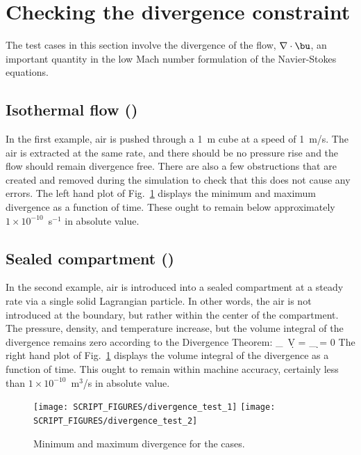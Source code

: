 \documentclass[11pt]{book}
\begin{document}
\section{Checking the divergence constraint}
\label{divergence_test}

The test cases in this section involve the divergence of the flow, $\nabla \cdot \bu$, an important quantity in the low Mach number formulation of the Navier-Stokes equations.

\subsection{Isothermal flow (\texorpdfstring{}{divergence\_test\_1})}
\label{divergence_test_1}

In the first example, air is pushed through a 1~m cube at a speed of 1~m/s. The air is extracted at the same rate, and there should be no pressure rise and the flow should remain divergence free. There are also a few obstructions that are created and removed during the simulation to check that this does not cause any errors. The left hand plot of Fig.~\ref{divergence_test_fig} displays the minimum and maximum divergence as a function of time. These ought to remain below approximately $1 \times 10^{-10}$~s$^{-1}$ in absolute value.

\subsection{Sealed compartment (\texorpdfstring{}{divergence\_test\_2})}
\label{divergence_test_2}

In the second example, air is introduced into a sealed compartment at a steady rate via a single solid Lagrangian particle. In other words, the air is not introduced at the boundary, but rather within the center of the compartment. The pressure, density, and temperature increase, but the volume integral of the divergence remains zero according to the Divergence Theorem:
\be
   \int_\Omega \nabla \cdot \bu \, \d V = \int_{\partial \Omega} \bu \cdot \d \bS = 0
\ee
The right hand plot of Fig.~\ref{divergence_test_fig} displays the volume integral of the divergence as a function of time. This ought to remain within machine accuracy, certainly less than $1 \times 10^{-10}$~m$^3$/s in absolute value.

\begin{figure}[!ht]
\texttt{[image: SCRIPT\_FIGURES/divergence\_test\_1]}
\texttt{[image: SCRIPT\_FIGURES/divergence\_test\_2]}
\caption[The  cases]{Minimum and maximum divergence for the  cases.}
\label{divergence_test_fig}
\end{figure}
\end{document}

